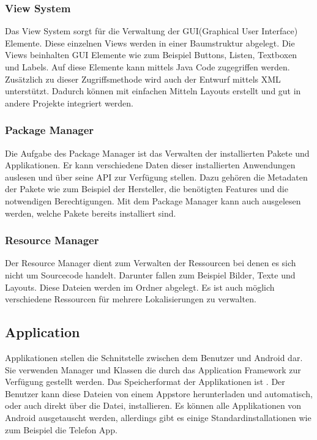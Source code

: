 \subsubsection{View System}
Das View System sorgt für die Verwaltung der GUI(Graphical User Interface) Elemente. Diese einzelnen Views werden in einer Baumstruktur abgelegt. Die Views beinhalten GUI Elemente wie zum Beispiel Buttons, Listen, Textboxen und Labels. Auf diese Elemente kann mittels Java Code zugegriffen werden. Zusätzlich zu dieser Zugriffsmethode wird auch der Entwurf mittels XML unterstützt. Dadurch können mit einfachen Mitteln Layouts erstellt und gut in andere Projekte integriert werden.\cite{26}


\subsubsection{Package Manager}
Die Aufgabe des Package Manager ist das Verwalten der installierten Pakete und Applikationen. Er kann verschiedene Daten dieser installierten Anwendungen auslesen und über seine API zur Verfügung stellen. Dazu gehören die Metadaten der Pakete wie zum Beispiel der Hersteller, die benötigten Features und die notwendigen Berechtigungen. Mit dem Package Manager kann auch ausgelesen werden, welche Pakete bereits installiert sind.\cite{27}


\subsubsection{Resource Manager}
Der Resource Manager dient zum Verwalten der Ressourcen bei denen es sich nicht um Sourcecode handelt. Darunter fallen zum Beispiel Bilder, Texte und Layouts. Diese Dateien werden im  Ordner abgelegt. Es ist auch möglich verschiedene Ressourcen für mehrere Lokalisierungen zu verwalten.\cite{28}


\subsection{Application}
Applikationen stellen die Schnitstelle zwischen dem Benutzer und Android dar. Sie verwenden Manager und Klassen die durch das Application Framework zur Verfügung gestellt werden. Das Speicherformat der Applikationen ist . Der Benutzer kann diese Dateien von einem Appstore herunterladen und automatisch, oder auch direkt über die  Datei, installieren. Es können alle Applikationen von Android ausgetauscht werden, allerdings gibt es einige Standardinstallationen wie zum Beispiel die Telefon App.\cite{29}